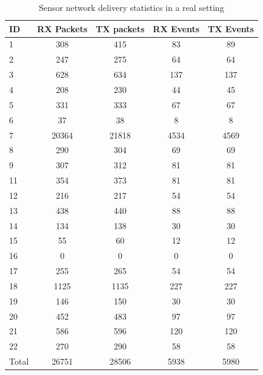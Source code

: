 \begin{table}
  \centering
  \begin{tabular}{lcccc}
  \hline
  ID & RX Packets & TX packets & RX Events & TX Events \\
  \hline
﻿1&      308     &    415    &      83     &     89\\
  2&       247    &     275   &       64    &      64\\
  3&       628    &     634   &      137    &     137\\
  4&       208    &     230   &       44    &      45\\
  5&       331    &     333   &       67    &      67\\
  6&        37    &      38   &        8    &       8\\
  7&     20364    &   21818   &     4534    &    4569\\
  8&       290    &     304   &       69    &      69\\
  9&       307    &     312   &       81    &      81\\
  11&       354   &      373   &       81    &      81\\
  12&       216   &      217  &        54    &      54\\
  13&       438   &      440  &        88    &      88\\
  14&       134   &      138  &        30    &      30\\
  15&        55   &       60  &        12    &      12\\
  16&         0   &        0  &         0    &       0\\
  17&       255   &      265  &        54    &      54\\
  18&      1125   &    1135   &      227     &    227\\
  19&       146   &      150  &        30    &      30\\
  20&       452   &     483   &       97     &     97\\
  21&       586   &     596   &      120     &    120\\
  22&       270   &      290  &        58    &      58 \\ 
  \hline
  Total&    ﻿26751   &    28506   &     5938    &    5980 \\ 
  \end{tabular}
  \caption{Sensor network delivery statistics in a real setting}
  \label{tab:recvstat}
\end{table}
